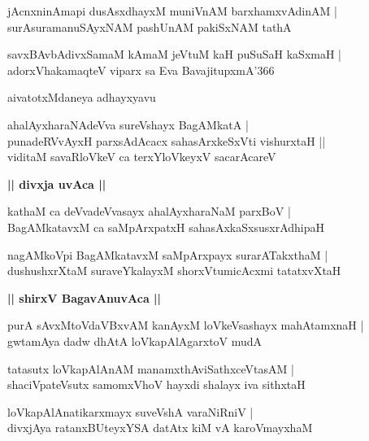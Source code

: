 \documentclass[twoside,12pt,openright]{book}
\newcounter{shloka}[chapter]
\def\uvaca#1{\centerline{{\large\textbf{#1}}}}
\begin{document}
\begin{shloka}%
jAcnxninAmapi dusAsxdhayxM muniVnAM barxhamxvAdinAM |\\
surAsuramanuSAyxNAM pashUnAM pakiSxNAM tathA 
\end{shloka}

\begin{shloka}%
savxBAvbAdivxSamaM kAmaM jeVtuM kaH puSuSaH kaSxmaH |\\
adorxVhakamaqteV viparx sa Eva BavajitupxmA\char'366
\end{shloka}

\begin{center}
aivatotxMdaneya adhayxyavu
\end{center}

\begin{shloka}%
ahalAyxharaNAdeVva sureVshayx BagAMkatA |\\
punadeRVvAyxH parxsAdAcacx sahasArxkeSxVti vishurxtaH ||\\
viditaM savaRloVkeV ca terxYloVkeyxV sacarAcareV 
\end{shloka}

\uvaca{|| divxja uvAca ||}

\begin{shloka}%
kathaM ca deVvadeVvasayx ahalAyxharaNaM parxBoV |\\
BagAMkatavxM ca saMpArxpatxH sahasAxkaSxsusxrAdhipaH
\end{shloka}

\begin{shloka}%
nagAMkoVpi BagAMkatavxM saMpArxpayx surarATakxthaM |\\
dushushxrXtaM suraveYkalayxM shorxVtumicAcxmi tatatxvXtaH 
\end{shloka}

\uvaca{|| shirxV BagavAnuvAca ||}

\begin{shloka}%
purA sAvxMtoVdaVBxvAM kanAyxM loVkeVsashayx mahAtamxnaH |\\
gwtamAya dadw dhAtA loVkapAlAgarxtoV mudA
\end{shloka}

\begin{shloka}%
tatasutx loVkapAlAnAM manamxthAviSathxceVtasAM |\\
shaciVpateVsutx samomxVhoV hayxdi shalayx iva sithxtaH 
\end{shloka}

\begin{shloka}%
loVkapAlAnatikarxmayx suveVshA varaNiRniV |\\
divxjAya ratanxBUteyxYSA datAtx kiM vA karoVmayxhaM
\end{shloka}
\end{document}
